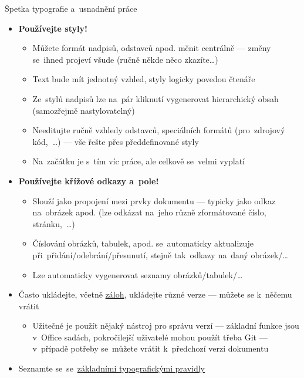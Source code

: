 \documentclass[compress, ucs, xelatex, 11pt, xcolor=svgnames, aspectratio=169,
	hyperref={
		bookmarks=true,
		unicode=true,
		colorlinks=true,
		pdftitle={Citacni software},
		plainpages=false,
		pdfauthor={Vojtech Zeisek},
		pdfsubject={Kratky uvod do citacniho software},
		pdfcreator={XeLaTeX},
		pdfkeywords={citace, reference, software, literatura},
		linkcolor=Crimson, %
		anchorcolor=Magenta, %
		citecolor=Magenta, %
		filecolor=Magenta, %
		menucolor=Magenta, %
		urlcolor=DarkTurquoise, %
		pdftex},
	url={hyphens, lowtilde} %
	]{beamer}
\begin{document}
\begin{frame}[allowframebreaks]{Špetka typografie a~usnadnění práce}
	\begin{itemize}
		\item \textbf{Používejte styly!}
			\begin{itemize}
				\item Můžete formát nadpisů, odstavců apod. měnit centrálně --- změny se~ihned projeví všude (ručně někde něco zkazíte\ldots)
				\item Text bude mít jednotný vzhled, styly logicky povedou čtenáře
				\item Ze~stylů nadpisů lze na~pár kliknutí vygenerovat hierarchický obsah (samozřejmě nastylovatelný)
				\item Needitujte ručně vzhledy odstavců, speciálních formátů (pro~zdrojový kód,~\ldots) --- vše řešte přes předdefinované styly
				\item Na~začátku je s~tím víc práce, ale celkově se~velmi vyplatí
			\end{itemize}
		\item \textbf{Používejte křížové odkazy a~pole!}
			\begin{itemize}
				\item Slouží jako propojení mezi prvky dokumentu --- typicky jako odkaz na~obrázek apod. (lze odkázat na~jeho různě zformátované číslo, stránku,~\ldots)
				\item Číslování obrázků, tabulek, apod. se~automaticky aktualizuje při~přidání/odebrání/přesunutí, stejně tak~odkazy na~daný obrázek/\ldots
				\item Lze automaticky vygenerovat seznamy obrázků/tabulek/\ldots
			\end{itemize}
		\item Často ukládejte, včetně \href{https://www.natur.cuni.cz/biologie/botanika/provozni-informace/servery-weby-a-pocitace/moznosti-zalohovani-dat}{záloh}, ukládejte různé verze --- můžete se k~něčemu vrátit
		\begin{itemize}
			\item Užitečné je použít nějaký nástroj pro správu verzí --- základní funkce jsou v~Office sadách, pokročilejší uživatelé mohou použít třeba Git --- v~případě potřeby se~můžete vrátit k~předchozí verzi dokumentu
		\end{itemize}
		\item Seznamte se~se~\href{https://duckduckgo.com/?q=typografick\%C3\%A1+pravidla&ia=web}{základními typografickými pravidly}
		\begin{itemize}

\end{itemize}
\end{itemize}
\end{frame}
\end{document}
